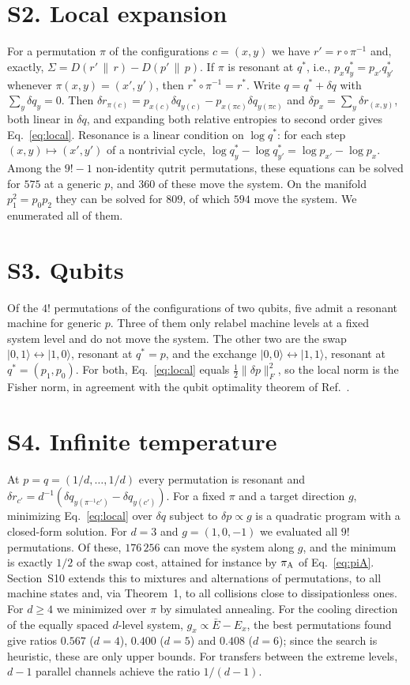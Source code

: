 \documentclass[aps,prl,reprint,superscriptaddress,amsmath,amssymb]{revtex4-2}
\newcommand{\Dr}[2]{D(#1\,\|\,#2)}
\begin{document}
\section{S2. Local expansion}
For a permutation $\pi$ of the configurations $c=(x,y)$ we have $r'=r\circ\pi^{-1}$ and, exactly,
$\Sigma=\Dr{r'}{r}-\Dr{p'}{p}$. If $\pi$ is resonant at $q^*$, i.e., $p_xq^*_y=p_{x'}q^*_{y'}$ whenever
$\pi(x,y)=(x',y')$, then $r^*\circ\pi^{-1}=r^*$. Write $q=q^*+\delta q$ with $\sum_y\delta q_y=0$. Then
$\delta r_{\pi(c)}=p_{x(c)}\delta q_{y(c)}-p_{x(\pi c)}\delta q_{y(\pi c)}$ and $\delta p_x=\sum_y\delta r_{(x,y)}$, both
linear in $\delta q$, and expanding both relative entropies to second order gives Eq.~\eqref{eq:local}. Resonance is a
linear condition on $\log q^*$: for each step $(x,y)\mapsto(x',y')$ of a nontrivial cycle,
$\log q^*_y-\log q^*_{y'}=\log p_{x'}-\log p_x$. Among the $9!-1$ non-identity qutrit permutations, these equations
can be solved for $575$ at a generic $p$, and $360$ of these move the system. On the manifold $p_1^2=p_0p_2$ they can
be solved for $809$, of which $594$ move the system. We enumerated all of them.

\section{S3. Qubits}
Of the $4!$ permutations of the configurations of two qubits, five admit a resonant machine for generic $p$. Three of
them only relabel machine levels at a fixed system level and do not move the system. The other two are the swap
$|0,1\rangle\leftrightarrow|1,0\rangle$, resonant at $q^*=p$, and the exchange $|0,0\rangle\leftrightarrow|1,1\rangle$,
resonant at $q^*=(p_1,p_0)$. For both, Eq.~\eqref{eq:local} equals $\tfrac12\|\delta p\|_F^2$, so the local norm is the
Fisher norm, in agreement with the qubit optimality theorem of Ref.~\cite{Taranto2025}.

\section{S4. Infinite temperature}
At $p=q=(1/d,\dots,1/d)$ every permutation is resonant and
$\delta r_{c'}=d^{-1}(\delta q_{y(\pi^{-1}c')}-\delta q_{y(c')})$. For a fixed $\pi$ and a target direction $g$,
minimizing Eq.~\eqref{eq:local} over $\delta q$ subject to $\delta p\propto g$ is a quadratic program with a
closed-form solution. For $d=3$ and $g=(1,0,-1)$ we evaluated all $9!$ permutations. Of these, $176\,256$ can move the
system along $g$, and the minimum is exactly $1/2$ of the swap cost, attained for instance by $\pi_{\rm A}$ of
Eq.~\eqref{eq:piA}. Section~S10 extends this to mixtures and alternations of permutations, to all machine states and,
via Theorem~1, to all collisions close to dissipationless ones. For $d\geq4$ we minimized over $\pi$ by simulated
annealing. For the cooling direction of the equally spaced $d$-level system, $g_x\propto\bar E-E_x$, the best
permutations found give ratios $0.567$ ($d=4$), $0.400$ ($d=5$) and $0.408$ ($d=6$); since the search is heuristic,
these are only upper bounds. For transfers between the extreme levels, $d-1$ parallel channels achieve the ratio
$1/(d-1)$.
\end{document}
